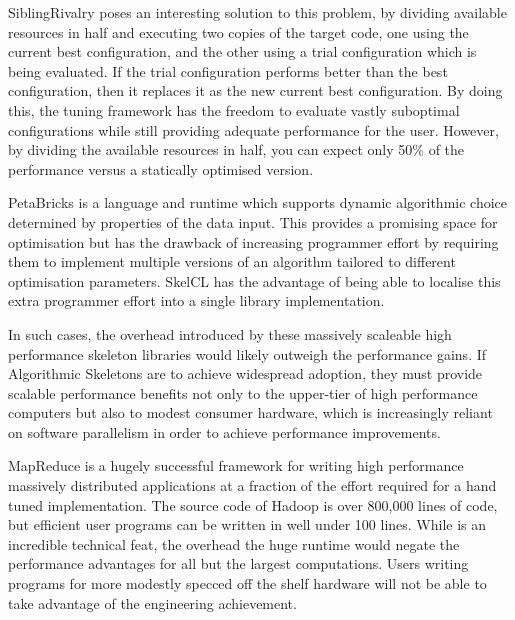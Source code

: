 SiblingRivalry poses an interesting solution to this problem, by
dividing available resources in half and executing two copies of the
target code, one using the current best configuration, and the other
using a trial configuration which is being evaluated. If the trial
configuration performs better than the best configuration, then it
replaces it as the new current best configuration. By doing this, the
tuning framework has the freedom to evaluate vastly suboptimal
configurations while still providing adequate performance for the
user. However, by dividing the available resources in half, you can
expect only 50\% of the performance versus a statically optimised
version.

PetaBricks is a language and runtime which supports dynamic
algorithmic choice determined by properties of the data input. This
provides a promising space for optimisation but has the drawback of
increasing programmer effort by requiring them to implement multiple
versions of an algorithm tailored to different optimisation
parameters. SkelCL has the advantage of being able to localise this
extra programmer effort into a single library implementation.

In such cases, the overhead introduced by these massively scaleable
high performance skeleton libraries would likely outweigh the
performance gains. If Algorithmic Skeletons are to achieve widespread
adoption, they must provide scalable performance benefits not only to
the upper-tier of high performance computers but also to modest
consumer hardware, which is increasingly reliant on software
parallelism in order to achieve performance improvements.

MapReduce is a hugely successful framework for writing high
performance massively distributed applications at a fraction of the
effort required for a hand tuned implementation. The source code of
Hadoop is over 800,000 lines of code, but efficient user programs can
be written in well under 100 lines. While is an incredible technical
feat, the overhead the huge runtime would negate the performance
advantages for all but the largest computations. Users writing
programs for more modestly specced off the shelf hardware will not be
able to take advantage of the engineering achievement.




